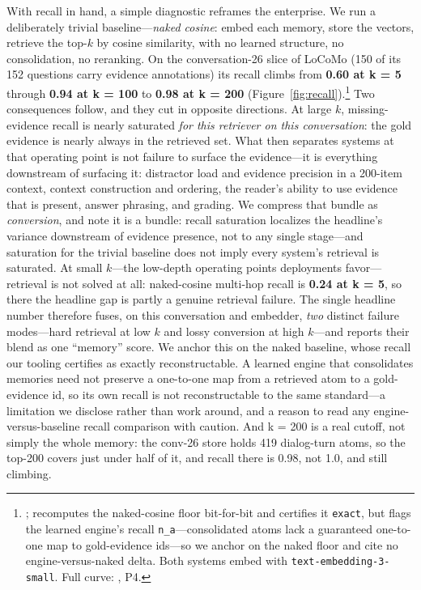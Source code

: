 \documentclass[11pt]{article}
\begin{document}
With recall in hand, a simple diagnostic reframes the enterprise. We run a deliberately trivial baseline---\emph{naked cosine}: embed each memory, store the vectors, retrieve the top-$k$ by cosine similarity, with no learned structure, no consolidation, no reranking. On the conversation-26 slice of LoCoMo (150 of its 152 questions carry evidence annotations) its recall climbs from \textbf{0.60 at k = 5} through \textbf{0.94 at k = 100} to \textbf{0.98 at k = 200} (Figure~\ref{fig:recall}).\footnote{;  recomputes the naked-cosine floor bit-for-bit and certifies it \texttt{exact}, but flags the learned engine's recall \texttt{n\_a}---consolidated atoms lack a guaranteed one-to-one map to gold-evidence ids---so we anchor on the naked floor and cite no engine-versus-naked delta. Both systems embed with \texttt{text-embedding-3-small}. Full curve: , P4.} Two consequences follow, and they cut in opposite directions. At large $k$, missing-evidence recall is nearly saturated \emph{for this retriever on this conversation}: the gold evidence is nearly always in the retrieved set. What then separates systems at that operating point is not failure to surface the evidence---it is everything downstream of surfacing it: distractor load and evidence precision in a 200-item context, context construction and ordering, the reader's ability to use evidence that is present, answer phrasing, and grading. We compress that bundle as \emph{conversion}, and note it is a bundle: recall saturation localizes the headline's variance downstream of evidence presence, not to any single stage---and saturation for the trivial baseline does not imply every system's retrieval is saturated. At small $k$---the low-depth operating points deployments favor---retrieval is not solved at all: naked-cosine multi-hop recall is \textbf{0.24 at k = 5}, so there the headline gap is partly a genuine retrieval failure. The single headline number therefore fuses, on this conversation and embedder, \emph{two} distinct failure modes---hard retrieval at low $k$ and lossy conversion at high $k$---and reports their blend as one ``memory'' score. We anchor this on the naked baseline, whose recall our tooling certifies as exactly reconstructable. A learned engine that consolidates memories need not preserve a one-to-one map from a retrieved atom to a gold-evidence id, so its own recall is not reconstructable to the same standard---a limitation we disclose rather than work around, and a reason to read any engine-versus-baseline recall comparison with caution. And k = 200 is a real cutoff, not simply the whole memory: the conv-26 store holds 419 dialog-turn atoms, so the top-200 covers just under half of it, and recall there is 0.98, not 1.0, and still climbing.
\end{document}
